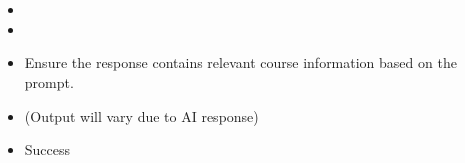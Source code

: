 \documentclass[letterpaper,10pt,english]{sphinxmanual}
\begin{document}
\section{}
\label{\detokenize{src/genAITestCases:test-cases-for-ai-search-courses}}

\subsection{}
\label{\detokenize{src/genAITestCases:test-case-test-ai-search-courses-success}}\begin{itemize}
\item {} 
\sphinxAtStartPar
{} 

\item {} 
\sphinxAtStartPar
{}

\begin{sphinxVerbatim}[commandchars=\\\{\}]
\end{sphinxVerbatim}

\item {} 
\sphinxAtStartPar
{}
\sphinxhyphen{} Ensure the response contains relevant course information based on the prompt.

\item {} 
\sphinxAtStartPar
{}
\sphinxhyphen{} (Output will vary due to AI response)

\item {} 
\sphinxAtStartPar
{} Success

\end{itemize}
\end{document}
